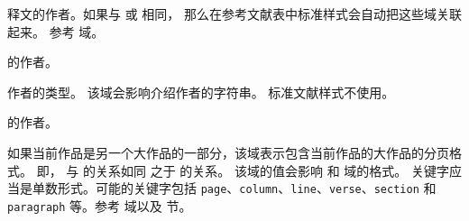 \begin{fieldlist}

释文的作者。如果与  或  相同，
那么在参考文献表中标准样式会自动把这些域关联起来。
参考  域。




 的作者。




作者的类型。
该域会影响介绍作者的字符串。
标准文献样式不使用。




 的作者。



如果当前作品是另一个大作品的一部分，该域表示包含当前作品的大作品的分页格式。
即， 与  的关系如同  之于 的关系。
该域的值会影响  和  域的格式。
关键字应当是单数形式。可能的关键字包括 \texttt{page}、\texttt{column}、\texttt{line}、\texttt{verse}、\texttt{section} 和 \texttt{paragraph} 等。参考  域以及  节。




\end{fieldlist}
